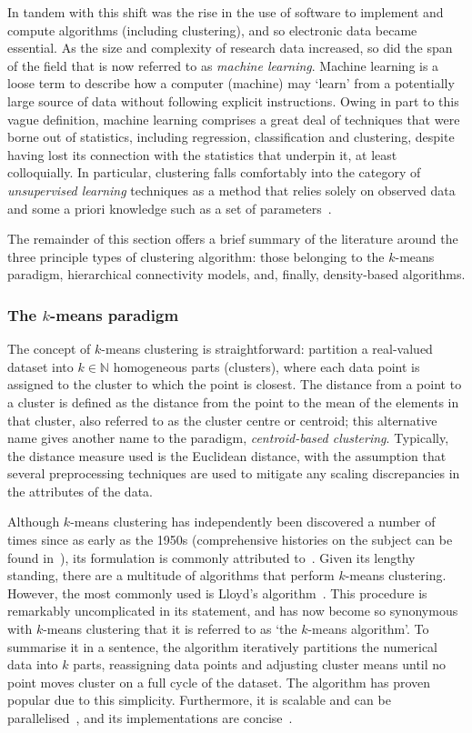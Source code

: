 In tandem with this shift was the rise in the use of software to implement and
compute algorithms (including clustering), and so electronic data became
essential. As the size and complexity of research data increased, so did the
span of the field that is now referred to as \emph{machine learning}. Machine
learning is a loose term to describe how a computer (machine) may `learn' from a
potentially large source of data without following explicit instructions. Owing
in part to this vague definition, machine learning comprises a great deal of
techniques that were borne out of statistics, including regression,
classification and clustering, despite having lost its connection with the
statistics that underpin it, at least colloquially. In particular, clustering
falls comfortably into the category of \emph{unsupervised learning} techniques
as a method that relies solely on observed data and some a priori
knowledge such as a set of parameters~\cite{Dayan1999}.

The remainder of this section offers a brief summary of the literature around
the three principle types of clustering algorithm: those belonging to the
\(k\)-means paradigm, hierarchical connectivity models, and, finally,
density-based algorithms.

\subsubsection{The \(k\)-means paradigm}\label{subsubsec:kmeans}

The concept of \(k\)-means clustering is straightforward: partition a
real-valued dataset into \(k \in \mathbb N\) homogeneous parts (clusters), where
each data point is assigned to the cluster to which the point is closest. The
distance from a point to a cluster is defined as the distance from the point to
the mean of the elements in that cluster, also referred to as the cluster centre
or centroid; this alternative name gives another name to the paradigm,
\emph{centroid-based clustering}. Typically, the distance measure used is the
Euclidean distance, with the assumption that several preprocessing techniques
are used to mitigate any scaling discrepancies in the attributes of the data.

Although \(k\)-means clustering has independently been discovered a number of
times since as early as the 1950s (comprehensive histories on the subject can be
found in~\cite{Bock2007,Jain2010}), its formulation is commonly attributed
to~\cite{Hartigan1979}. Given its lengthy standing, there are a multitude of
algorithms that perform \(k\)-means clustering. However, the most commonly used
is Lloyd's algorithm~\cite{Lloyd1982}. This procedure is remarkably
uncomplicated in its statement, and has now become so synonymous with
\(k\)-means clustering that it is referred to as `the \(k\)-means algorithm'. To
summarise it in a sentence, the algorithm iteratively partitions the numerical
data into \(k\) parts, reassigning data points and adjusting cluster means until
no point moves cluster on a full cycle of the dataset. The algorithm has proven
popular due to this simplicity. Furthermore, it is scalable and can be
parallelised~\cite{Bahmani2012}, and its implementations are
concise~\cite{Olafsson2008,Wu2009}.

